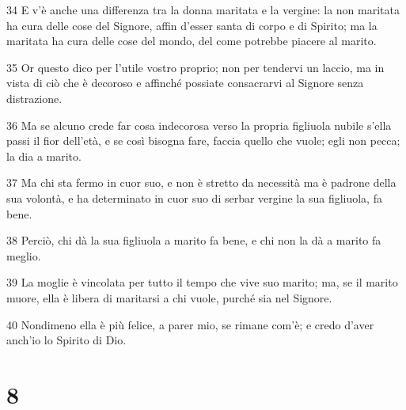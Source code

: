 \par 34 E v'è anche una differenza tra la donna maritata e la vergine: la non maritata ha cura delle cose del Signore, affin d'esser santa di corpo e di Spirito; ma la maritata ha cura delle cose del mondo, del come potrebbe piacere al marito.
\par 35 Or questo dico per l'utile vostro proprio; non per tendervi un laccio, ma in vista di ciò che è decoroso e affinché possiate consacrarvi al Signore senza distrazione.
\par 36 Ma se alcuno crede far cosa indecorosa verso la propria figliuola nubile s'ella passi il fior dell'età, e se così bisogna fare, faccia quello che vuole; egli non pecca; la dia a marito.
\par 37 Ma chi sta fermo in cuor suo, e non è stretto da necessità ma è padrone della sua volontà, e ha determinato in cuor suo di serbar vergine la sua figliuola, fa bene.
\par 38 Perciò, chi dà la sua figliuola a marito fa bene, e chi non la dà a marito fa meglio.
\par 39 La moglie è vincolata per tutto il tempo che vive suo marito; ma, se il marito muore, ella è libera di maritarsi a chi vuole, purché sia nel Signore.
\par 40 Nondimeno ella è più felice, a parer mio, se rimane com'è; e credo d'aver anch'io lo Spirito di Dio.

\chapter{8}

